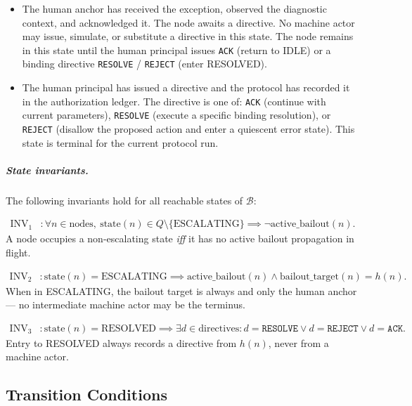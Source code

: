 \begin{itemize}
\item[\textbf{HUMAN\_ACKNOWLEDGED.}] The human anchor has received the exception, observed the diagnostic context, and acknowledged it. The node awaits a directive. No machine actor may issue, simulate, or substitute a directive in this state. The node remains in this state until the human principal issues \texttt{ACK} (return to IDLE) or a binding directive \texttt{RESOLVE} / \texttt{REJECT} (enter RESOLVED).

\item[\textbf{RESOLVED.}] The human principal has issued a directive and the protocol has recorded it in the authorization ledger. The directive is one of: \texttt{ACK} (continue with current parameters), \texttt{RESOLVE} (execute a specific binding resolution), or \texttt{REJECT} (disallow the proposed action and enter a quiescent error state). This state is terminal for the current protocol run.
\end{itemize}

\subparagraph{State invariants.} The following invariants hold for all reachable states of $\mathcal{B}$:

\begin{align}
\text{INV}_1 &: \forall n \in \text{nodes},\ \text{state}(n) \in Q \setminus \{\text{ESCALATING}\} \implies \neg\text{active\_bailout}(n). \tag{INV-1}
\end{align}
A node occupies a non-escalating state \emph{iff} it has no active bailout propagation in flight.

\begin{align}
\text{INV}_2 &: \text{state}(n) = \text{ESCALATING} \implies \text{active\_bailout}(n) \land \text{bailout\_target}(n) = h(n). \tag{INV-2}
\end{align}
When in ESCALATING, the bailout target is always and only the human anchor — no intermediate machine actor may be the terminus.

\begin{align}
\text{INV}_3 &: \text{state}(n) = \text{RESOLVED} \implies \exists d \in \text{directives}: d = \texttt{RESOLVE} \lor d = \texttt{REJECT} \lor d = \texttt{ACK}. \tag{INV-3}
\end{align}
Entry to RESOLVED always records a directive from $h(n)$, never from a machine actor.

\subsection{Transition Conditions}\label{sec:transition-conditions}

